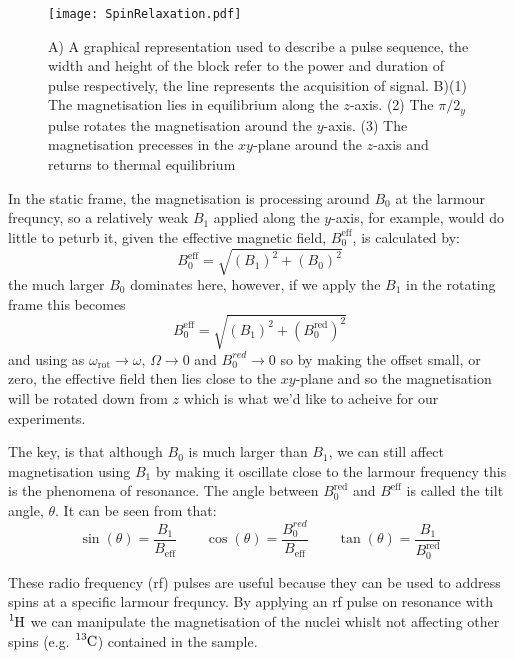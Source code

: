\begin{figure}
  \begin{center}
  \texttt{[image: SpinRelaxation.pdf]}
  \end{center}
  \caption{A) A graphical representation used to describe a pulse sequence, the width and height of the block
  refer to the power and duration of pulse respectively, the line represents the acquisition of signal. B)(1) The
  magnetisation lies in equilibrium along the $z$-axis. (2)  The $\pi/2_y$ pulse rotates the magnetisation around the $y$-axis. (3) The magnetisation precesses in the $xy$-plane around the $z$-axis and returns to thermal equilibrium}
  \label{fig:Pulse}
\end{figure}

In the static frame, the magnetisation is processing around $B_0$ at the larmour frequncy, so a relatively weak $B_1$ applied along the $y$-axis, for example, would do little to peturb it, given the effective magnetic field, $B^{\text{eff}}_0$, is calculated by:
\begin{equation}
  B^{\text{eff}}_0 = \sqrt{(B_1)^2+(B_0)^2}
\end{equation}
the much larger $B_0$ dominates here, however, if we apply the $B_1$ in the rotating
frame this becomes
\begin{equation}
  B^{\text{eff}}_0 = \sqrt{(B_1)^2+(B^{\text{red}}_0)^2}
\end{equation}
and using  as $\omega_{\text{rot}}\rightarrow\omega$, $\Omega\rightarrow0$ and $B^{red}_0\rightarrow0$ so by making the offset small, or zero, the effective field
then lies close to the $xy$-plane and so the magnetisation will be rotated down
from $z$ which is what we'd like to acheive for our experiments.

The key, is that although $B_0$ is much larger than $B_1$, we can still affect magnetisation using $B_1$ by making it oscillate close to the larmour frequency
this is the phenomena of resonance. The angle between $B^{\text{red}}_0$ and $B^{\text{eff}}$ is
called the tilt angle, $\theta$. It can be seen from  that:
\begin{equation}
\sin(\theta) = \frac{B_1}{B_{\text{eff}}}\qquad\cos(\theta) = \frac{B^{red}_0}{B_{\text{eff}}}\qquad\tan(\theta) = \frac{B_1}{B^{\text{red}}_0}
\end{equation}

These radio frequency (rf) pulses are useful because they can be used to address spins at a specific larmour
frequncy. By applying an rf pulse on resonance with $\ce{^1H}$ we can manipulate the magnetisation of the nuclei whislt not affecting other spins (e.g. $\ce{^13C}$) contained in the sample.

